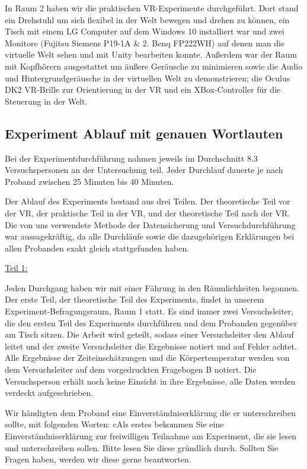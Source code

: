 \documentclass{Bericht}
\begin{document}
In Raum 2 haben wir die praktischen VR-Experimente durchgeführt. Dort stand ein Drehstuhl um sich flexibel in der Welt bewegen und drehen zu können, ein Tisch mit einem LG Computer auf dem  Windows 10 installiert war und zwei Monitore (Fujitsu Siemens P19-1A \& 2. Benq FP222WH) auf denen man die virtuelle Welt sehen und mit Unity bearbeiten konnte. Außerdem war der Raum mit Kopfhörern ausgestattet um äußere Geräusche zu minimieren sowie die Audio und Hintergrundgeräusche in der virtuellen Welt zu demonstrieren; die Oculus DK2 VR-Brille zur Orientierung in der VR und ein XBox-Controller für die Steuerung in der Welt.

\subsection {Experiment Ablauf mit genauen Wortlauten}

Bei der Experimentdurchführung nahmen jeweils im Durchschnitt 8.3 Versuchspersonen an der Untersuchung teil. Jeder Durchlauf dauerte je nach Proband zwischen 25 Minuten bis 40 Minuten.

Der Ablauf des Experiments bestand aus drei Teilen. Der theoretische Teil vor der VR, der praktische Teil in der VR, und der theoretische Teil nach der VR. Die von uns verwendete Methode der Datensicherung und Versuchdurchführung war aussagekräftig, da alle Durchläufe sowie die dazugehörigen Erklärungen bei allen Probanden exakt gleich stattgefunden haben.

\underline{Teil 1:}

Jeden Durchgang haben wir mit einer Fährung in den Räumlichkeiten begonnen. Der erste Teil, der theoretische Teil des Experiments, findet in unserem Experiment-Befragungsraum, \glqq Raum 1\grqq{} statt. Es sind immer zwei Versuchsleiter, die den ersten Teil des Experiments durchführen und dem Probanden gegenüber am Tisch sitzen. Die Arbeit wird geteilt, sodass einer Versuchsleiter den Ablauf leitet und der zweite Versuchsleiter die Ergebnisse notiert und auf Fehler achtet. Alle Ergebnisse der Zeiteinschätzungen und die Körpertemperatur werden von dem Versuchsleiter auf dem vorgedruckten \glqq Fragebogen B\grqq{} notiert. Die Versuchsperson erhält noch keine Einsicht in ihre Ergebnisse, alle Daten werden verdeckt aufgeschrieben.

Wir händigten dem Proband eine Einverständniserklärung die er unterschreiben sollte, mit folgenden Worten:
c\glqq Als erstes bekommen Sie eine Einverständniserklärung zur freiwilligen Teilnahme am Experiment, die sie lesen und unterschreiben sollen. Bitte lesen Sie diese gründlich durch. Sollten Sie Fragen haben, werden wir diese gerne beantworten.\grqq{}
\end{document}
